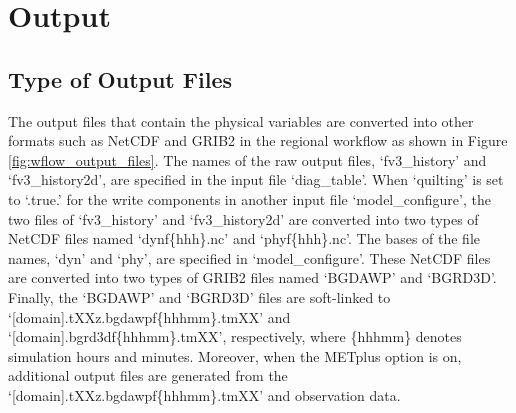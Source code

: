 \documentclass[11pt,fleqn]{report}              %
\begin{document}
\section{Output}                 
\label{sec:workflow_output}

\subsection{Type of Output Files}
\label{subsec:type_output}

The output files that contain the physical variables are converted into other formats such as NetCDF and GRIB2 in the regional workflow as shown in Figure \ref{fig:wflow_output_files}. The names of the raw output files, `fv3\_history' and `fv3\_history2d', are specified in the input file `diag\_table'. When `quilting' is set to `.true.' for the write components in another input file `model\_configure', the two files of `fv3\_history' and `fv3\_history2d' are converted into two types of NetCDF files named `dynf\{hhh\}.nc' and `phyf\{hhh\}.nc'. The bases of the file names, `dyn' and `phy', are specified in `model\_configure'. These NetCDF files are converted into two types of GRIB2 files named `BGDAWP' and `BGRD3D'. Finally, the `BGDAWP' and `BGRD3D' files are soft-linked to `[domain].tXXz.bgdawpf\{hhhmm\}.tmXX' and `[domain].bgrd3df\{hhhmm\}.tmXX', respectively, where \{hhhmm\} denotes simulation hours and minutes. Moreover, when the METplus option is on, additional output files are generated from the `[domain].tXXz.bgdawpf\{hhhmm\}.tmXX' and observation data. \\
\end{document}
